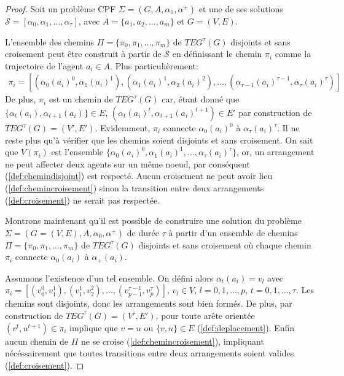 \documentclass[french, 12pt, letterpaper]{article}
\theoremstyle{definition}
\theoremstyle{proposition}
\theoremstyle{example}
\begin{document}
    \begin{proof}
        Soit un problème CPF $\Sigma = ( G, A, \alpha_0, \alpha^+ )$ et une de ses solutions 
        $\mathcal{S} = [\alpha_0, \alpha_1, \ldots, \alpha_\tau]$, avec
        $A = \{a_1, a_2, \ldots, a_m\}$ et $G = ( V, E )$.
        
        L'ensemble des chemins $\Pi = \{\pi_0, \pi_1, \ldots, \pi_m\}$ de $TEG^\tau(G)$ disjoints et 
        sans croisement peut être construit à partir de $\mathcal{S}$ en définissant le chemin
        $\pi_i$ comme la trajectoire de l'agent $a_i \in A$. Plus particulièrement: 
        \begin{gather*}
            \pi_i = [( \alpha_0(a_i)^0, \alpha_1(a_i)^1 ), ( \alpha_1(a_i)^1, \alpha_2(a_i)^2 ),
            \ldots, ( \alpha_{\tau-1}(a_i)^{\tau-1}, \alpha_\tau(a_i)^\tau )]
        \end{gather*}
        De plus, $\pi_i$ est un chemin de $TEG^\tau(G)$ car, étant donné que $\{\alpha_t(a_i), \alpha_{t+1}(a_i)\} \in E$, 
        $( \alpha_t(a_i)^t, \alpha_{t+1}(a_i)^{t+1} ) \in E'$ 
        par construction de $TEG^\tau(G) = ( V', E' )$. 
        Evidemment, $\pi_i$ connecte $\alpha_0(a_i)^0$ à $\alpha_\tau(a_i)^\tau$.
        Il ne reste plus qu'à vérifier que les chemins soient disjoints et sans croisement.
        On sait que $V(\pi_i)$ est l'ensemble $\{\alpha_0(a_i)^0, \alpha_1(a_i)^1, \ldots, \alpha_\tau(a_i)^\tau\}$, or, un arrangement ne peut affecter deux agents
        sur un même noeud, par conséquent (\ref{def:chemindisjoint}) est respecté.
        Aucun croisement ne peut avoir lieu (\ref{def:chemincroisement}) sinon la transition entre deux arrangements (\ref{def:croisement}) ne serait pas respectée.

        Montrons maintenant qu'il est possible de construire une solution du problème $\Sigma = ( G = ( V, E ), A, \alpha_0, \alpha^+ )$ de durée $\tau$ 
        à partir d'un ensemble de chemins $\Pi = \{\pi_0, \pi_1, \ldots, \pi_m\}$ de $TEG^\tau(G)$ disjoints et sans croisement 
        où chaque chemin $\pi_i$ connecte $\alpha_0(a_i)$ à $\alpha_+(a_i)$. 

        Assumons l'existence d'un tel ensemble. 
        On défini alors $\alpha_t(a_i) = v_l$ avec $\pi_i = [( v_0^0, v_1^1 ), ( v_1^1, v_2^2 ), \ldots, 
        ( v_{p-1}^{\tau-1}, v_p^\tau )]$, $v_l \in V$, $l = 0, 1, \ldots, p$, $t = 0, 1, \ldots, \tau$.
        Les chemins sont disjoints, donc les arrangements sont bien formés. 
        De plus, par construction de $TEG^\tau(G) = ( V', E' )$, pour toute arête orientée $( v^t, u^{t+1} ) \in \pi_i$ 
        implique que $v = u$ ou $\{v, u\} \in E$ (\ref{def:deplacement}). 
        Enfin aucun chemin de $\Pi$ ne se croise (\ref{def:chemincroisement}), impliquant nécéssairement que toutes transitions entre deux arrangements
        soient valides (\ref{def:croisement}).


    \end{proof}
\end{document}
